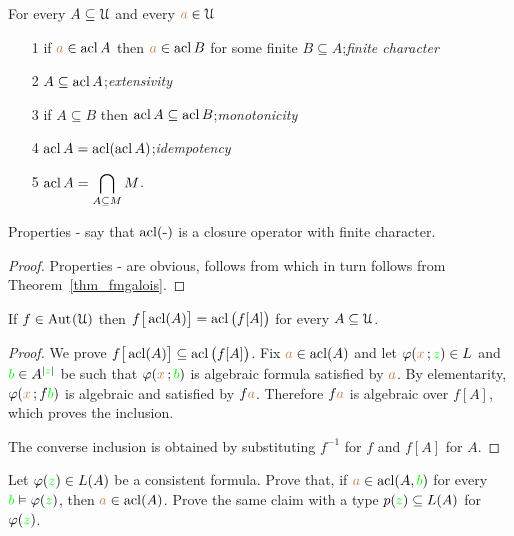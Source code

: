 \begin{corollary}\label{fmacl123} 
For every $A\subseteq\EuScript U$ and every ${\color{brown} a}\in\EuScript U$
\begin{itemize}
\item[1]  if ${\color{brown} a}\in\mathop{\rm acl} A$ then ${\color{brown} a}\in\mathop{\rm acl} B$ for some finite $B\subseteq A$;\hfill\emph{finite character}
\item[2]  $A\subseteq \mathop{\rm acl} A$;\hfill\emph{extensivity}
\item[3]  if $A\subseteq B$ then $\mathop{\rm acl} A\subseteq \mathop{\rm acl} B$;\hfill\emph{monotonicity}
\item[4]  $\mathop{\rm acl} A=\mathop{\rm acl}(\mathop{\rm acl} A)$;\hfill\emph{idempotency}
\item[5]  $\displaystyle\mathop{\rm acl} A=\bigcap_{A\subseteq M}M$.
\end{itemize} 
\end{corollary}

Properties - say that $\mathop{\rm acl}(\mbox{-})$ is a closure operator with finite character.

\begin{proof}
Properties - are obvious,  follows from  which in turn follows from Theorem~\ref{thm_fmgalois}.
\end{proof}

\begin{proposition}\label{prop_estensionemappechiusuraalgebrica}
If $f\in{\rm Aut\kern.15ex}(\EuScript U)$ then $f\big[\mathop{\rm acl}(A)\big]=\mathop{\rm acl}\big(f[A]\big)$ for every $A\subseteq\EuScript U$.
\end{proposition}

\begin{proof}
We prove $f\big[\mathop{\rm acl}(A)\big]\subseteq\mathop{\rm acl}\big(f[A]\big)$.
Fix ${\color{brown} a}\in\mathop{\rm acl}(A)$ and let $\varphi({\color{brown} x}\,;{\color{green} z})\in L$ and ${\color{green} b}\in A^{|{\color{green} z}|}$ be such that 
$\varphi({\color{brown} x}\,;{\color{green} b})$ is algebraic formula satisfied by ${\color{brown} a}$.
By elementarity, $\varphi({\color{brown} x}\,;f{\color{green} b})$ is algebraic and satisfied by $f{\color{brown} a}$.
Therefore  $f{\color{brown} a}$ is algebraic over $f[A]$, which proves the inclusion.

The converse inclusion is obtained by substituting  $f^{-1}$ for $f$ and $f[A]$ for $A$.
\end{proof}

\begin{exercise}\label{pofu}
Let $\varphi({\color{green} z})\in L(A)$ be a consistent formula.
Prove that, if ${\color{brown} a}\in\mathop{\rm acl}(A,{\color{green} b})$ for every ${\color{green} b}\vDash\varphi({\color{green} z})$, then ${\color{brown} a}\in\mathop{\rm acl}(A)$.
Prove the same claim with a type $p({\color{green} z})\subseteq L(A)$ for $\varphi({\color{green} z})$.\QED
\end{exercise}

